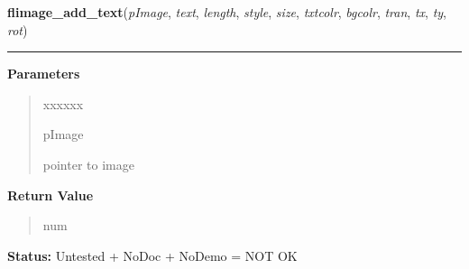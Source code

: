 \hspace{.8\funcindent}\begin{boxedminipage}{\funcwidth}

    \raggedright \textbf{flimage\_add\_text}(\textit{pImage}, \textit{text}, \textit{length}, \textit{style}, \textit{size}, \textit{txtcolr}, \textit{bgcolr}, \textit{tran}, \textit{tx}, \textit{ty}, \textit{rot})

    \vspace{-1.5ex}

    \rule{\textwidth}{0.5\fboxrule}
\setlength{\parskip}{2ex}
\setlength{\parskip}{1ex}
      \textbf{Parameters}
      \vspace{-1ex}

      \begin{quote}
        \begin{Ventry}{xxxxxx}

          \item[pImage]

          pointer to image

        \end{Ventry}

      \end{quote}

      \textbf{Return Value}
    \vspace{-1ex}

      \begin{quote}
      num

      \end{quote}

\textbf{Status:} Untested + NoDoc + NoDemo = NOT OK



    \end{boxedminipage}

    \label{xformslib:library:flimage_add_text_struct}

    \vspace{0.5ex}

